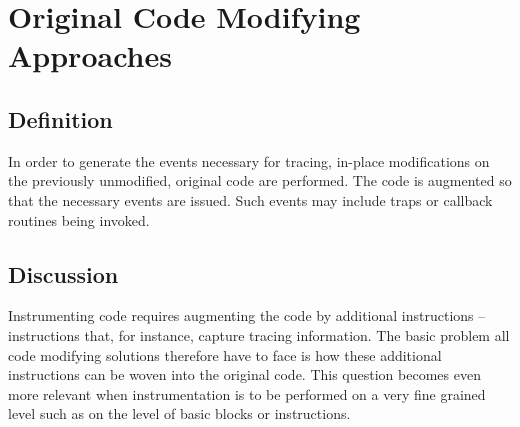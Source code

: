 





\section{Original Code Modifying Approaches}
\subsection*{Definition}
In order to generate the events necessary for tracing, in-place modifications 
on the previously unmodified, original code are performed. The code is 
augmented so that the necessary events are issued. Such events may include
traps or callback routines being invoked.

\subsection*{Discussion}
Instrumenting code requires augmenting the code by additional instructions -- instructions
that, for instance, capture tracing information. The basic problem all code modifying
solutions therefore have to face is how these additional instructions can be woven
into the original code. This question becomes even more relevant when instrumentation
is to be performed on a very fine grained level such as on the level of basic blocks
or instructions. 

